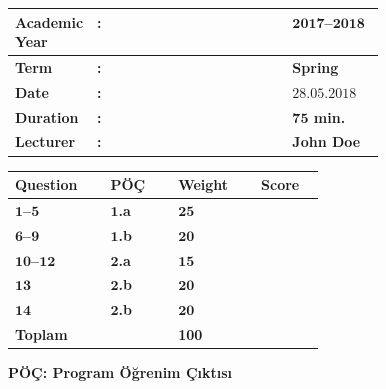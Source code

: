 \documentclass[a4paper, 11pt]{article}
\begin{document}
	\begin{table}[!ht]
		\renewcommand{\arraystretch}{1.5}
		\centering
		\begin{tabular}{@{}|>{\bfseries}L{0.18\linewidth}>{\bfseries}C{0.00\linewidth}>{\bfseries}L{0.25\linewidth}|@{}}
			\hline
			Academic Year  & : & $\bm{2017}$--$\bm{2018}$                  \\ \hline
			Term         & : & \textbf{Spring}                             \\ \hline
			Date         & : & $\bm{28.05.2018}$                           \\ \hline
			Duration          & : & $\bm{75}$ \textbf{min.}                \\ \hline
			Lecturer & : & \textbf{John Doe} \\ \hline
		\end{tabular}
		\hfill
		\renewcommand{\arraystretch}{1.1}
		\begin{tabular}{|>{\bfseries}C{0.1\linewidth}|>{\bfseries}C{0.1\linewidth}|>{\bfseries}C{0.1\linewidth}|>{\bfseries}C{0.06\linewidth}|}
			\hline
			Question    & PÖÇ      & Weight & Score \\ \hline
			$\bm{1}$--$\bm{5}$     & $\bm{1}$.a & $\bm{25}$    & ~   \\ \hline
			$\bm{6}$--$\bm{9}$     & $\bm{1}$.b & $\bm{20}$    & ~   \\ \hline
			$\bm{10}$--$\bm{12}$   & $\bm{2}$.a & $\bm{15}$    & ~   \\ \hline
			$\bm{13}$              & $\bm{2}$.b & $\bm{20}$    & ~   \\ \hline
			$\bm{14}$              & $\bm{2}$.b & $\bm{20}$    & ~   \\ \hline
			Toplam                 & ~          & 100          & ~   \\ \hline
		\end{tabular}
		\vspace{-0.45cm}
		\begin{flushright}
			\textbf{PÖÇ: Program Öğrenim Çıktısı}
		\end{flushright}
	\end{table}
	\vspace{-1cm}
	
\end{document}
